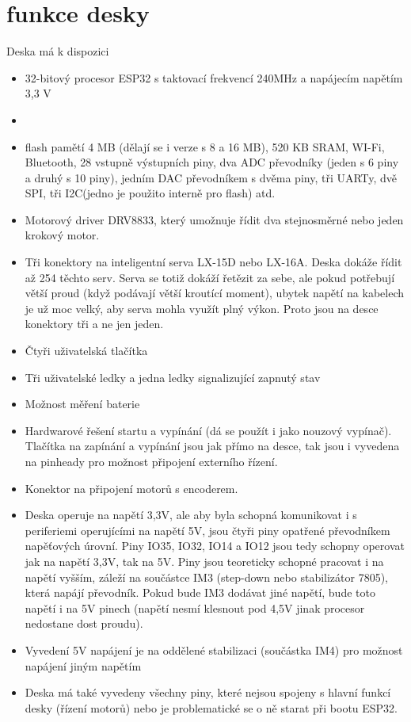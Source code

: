 \documentclass{template/socthesis}
\begin{document}
\chapter*{funkce desky}
Deska má k dispozici
\begin{itemize}
\item 32-bitový procesor ESP32 s taktovací frekvencí 240MHz a napájecím napětím 3,3 V 
\item \item flash pamětí 4 MB (dělají se i verze s 8 a 16 MB), 520 KB SRAM, WI-Fi, Bluetooth, 28 vstupně výstupních piny, dva ADC převodníky (jeden s 6 piny a druhý s 10 piny), jedním DAC převodníkem s dvěma piny, tři UARTy, dvě SPI, tři I2C(jedno je použito interně pro flash) atd.
\item Motorový driver DRV8833, který umožnuje řídit dva stejnosměrné nebo jeden krokový motor.
\item Tři konektory na inteligentní serva LX-15D nebo LX-16A. Deska dokáže řídit až 254 těchto serv. Serva se totiž dokáží řetězit za sebe, ale pokud potřebují větší proud (když podávají větší kroutící moment), ubytek napětí na kabelech je už moc velký, aby serva mohla využít plný výkon. Proto jsou na desce konektory tři a ne jen jeden.
\item Čtyři uživatelská tlačítka
\item Tři uživatelské ledky a jedna ledky signalizující zapnutý stav
\item Možnost měření baterie
\item Hardwarové řešení startu a vypínání (dá se použít i jako nouzový vypínač). Tlačítka na zapínání a vypínání jsou jak přímo na desce, tak jsou i vyvedena na pinheady pro možnost připojení externího řízení.
\item Konektor na připojení motorů s encoderem.
\item Deska operuje na napětí 3,3V, ale aby byla schopná komunikovat i s periferiemi operujícími
na napětí 5V, jsou čtyři piny opatřené převodníkem napěťových úrovní.
Piny IO35, IO32, IO14 a IO12 jsou tedy schopny operovat jak na napětí 3,3V, tak na 5V.
Piny jsou teoreticky schopné pracovat i na napětí vyšším, záleží na součástce IM3
(step-down nebo stabilizátor 7805), která napájí převodník. Pokud bude IM3 dodávat jiné napětí, bude toto napětí i na 5V pinech (napětí nesmí klesnout pod 4,5V jinak procesor nedostane dost proudu).
\item Vyvedení 5V napájení je na oddělené stabilizaci (součástka IM4) pro možnost napájení jiným napětím
\item Deska má také vyvedeny všechny piny, které nejsou spojeny 
s hlavní funkcí desky (řízení motorů) nebo je problematické se o ně starat při bootu ESP32.

\end{itemize}
	
\end{document}
